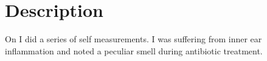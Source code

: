 \section{Description}

On  I did a series of self measurements.  I was
suffering from inner ear inflammation and noted a peculiar smell during
antibiotic treatment.

